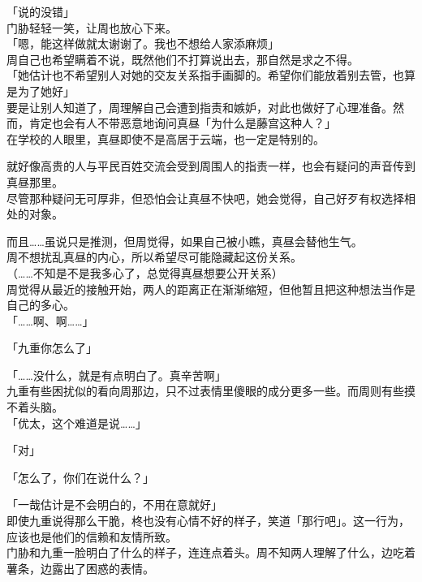 「说的没错」\\

门胁轻轻一笑，让周也放心下来。\\

「嗯，能这样做就太谢谢了。我也不想给人家添麻烦」\\

周自己也希望瞒着不说，既然他们不打算说出去，那自然是求之不得。\\

「她估计也不希望别人对她的交友关系指手画脚的。希望你们能放着别去管，也算是为了她好」\\

要是让别人知道了，周理解自己会遭到指责和嫉妒，对此也做好了心理准备。然而，肯定也会有人不带恶意地询问真昼「为什么是藤宫这种人？」\\

在学校的人眼里，真昼即使不是高居于云端，也一定是特别的。

就好像高贵的人与平民百姓交流会受到周围人的指责一样，也会有疑问的声音传到真昼那里。\\

尽管那种疑问无可厚非，但恐怕会让真昼不快吧，她会觉得，自己好歹有权选择相处的对象。

而且……虽说只是推测，但周觉得，如果自己被小瞧，真昼会替他生气。\\

周不想扰乱真昼的内心，所以希望尽可能隐藏起这份关系。\\

（……不知是不是我多心了，总觉得真昼想要公开关系）\\

周觉得从最近的接触开始，两人的距离正在渐渐缩短，但他暂且把这种想法当作是自己的多心。\\

「……啊、啊……」

「九重你怎么了」

「……没什么，就是有点明白了。真辛苦啊」\\

九重有些困扰似的看向周那边，只不过表情里傻眼的成分更多一些。而周则有些摸不着头脑。\\

「优太，这个难道是说……」

「对」

「怎么了，你们在说什么？」

「一哉估计是不会明白的，不用在意就好」\\

即使九重说得那么干脆，柊也没有心情不好的样子，笑道「那行吧」。这一行为，应该也是他们的信赖和友情所致。\\

门胁和九重一脸明白了什么的样子，连连点着头。周不知两人理解了什么，边吃着薯条，边露出了困惑的表情。
